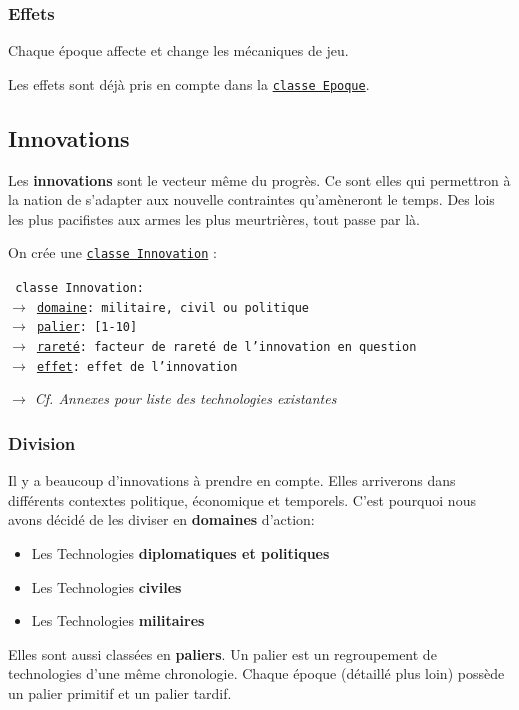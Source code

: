 \documentclass{article}
\newcommand{\ulcolor}[2][class]{\setulcolor{#1}\ul{#2}}
\newcommand{\ulcolor}[2][var]{\setulcolor{#1}\ul{#2}}
\newcommand{\ulcolor}[2][func]{\setulcolor{#1}\ul{#2}}
\newcommand*{\mybox}[2]{\colorbox{#1!30}{\parbox{.98\linewidth}{#2}}}
\newcommand\tab[1][0.5cm]{\hspace*{#1}}
\newcommand{\genbox}[1]{\mybox{verylightgray}{#1}}
\newcommand{\classbox}[1]{\mybox{palegreen}{\texttt{\textcolor{codeColour}{#1}}}}
\newcommand{\class}[1]{\texttt{\textcolor{codeColour}{\ulcolor[class]{#1}}}}
\newcommand{\var}[1]{\texttt{\textcolor{codeColour}{\ulcolor[var]{#1}}}}
\begin{document}
            \subsubsection{Effets}
                Chaque époque affecte et change les mécaniques de jeu. \\
                    
                \tab \genbox{
                    Les effets sont déjà pris en compte dans la \class{classe Epoque}.
                }

        \subsection{Innovations}
            Les \textbf{innovations} sont le vecteur même du progrès. Ce sont elles qui permettron à la nation de s'adapter aux nouvelle contraintes qu'amèneront le temps. Des lois les plus pacifistes aux armes les plus meurtrières, tout passe par là.\\

            \tab \genbox{
                    On crée une \class{classe Innovation} : \\
                    \tab \classbox{
                        classe Innovation:\\
                            $\rightarrow$ \var{domaine}: militaire, civil ou politique \\
                            $\rightarrow$ \var{palier}: [1-10] \\
                            $\rightarrow$ \var{raret\'e}: facteur de rareté de l'innovation en question \\
                            $\rightarrow$ \var{effet}: effet de l'innovation\\  
                    } 
                }
            
            \textit{$\rightarrow$ Cf. Annexes pour liste des technologies existantes} \\
            
            \subsubsection{Division}
                Il y a beaucoup d'innovations à prendre en compte. Elles arriverons dans différents contextes politique, économique et temporels. C'est pourquoi nous avons décidé de les diviser en \textbf{domaines} d'action:
                    \begin{itemize}
                        \item Les Technologies \textbf{diplomatiques et politiques}
                        \item Les Technologies \textbf{civiles}
                        \item Les Technologies \textbf{militaires}
                    \end{itemize}
                Elles sont aussi classées en \textbf{paliers}. Un palier est un regroupement de technologies d'une même chronologie. Chaque époque (détaillé plus loin) possède un palier primitif et un palier tardif. \\
                
\end{document}
